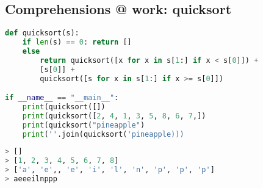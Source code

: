 \subsection{Comprehensions @ work: quicksort}
\begin{lstlisting}[language=Python]
def quicksort(s):
	if len(s) == 0: return []
	else
		return quicksort([x for x in s[1:] if x < s[0]]) + 
		[s[0]] + 
		quicksort([s for x in s[1:] if x >= s[0]])

if __name__ == "__main__":
	print(quicksort([])
	print(quicksort([2, 4, 1, 3, 5, 8, 6, 7,])
	print(quicksort("pineapple")
	print(''.join(quicksort('pineapple)))
\end{lstlisting}

\begin{lstlisting}[language=Python]
> []
> [1, 2, 3, 4, 5, 6, 7, 8]
> ['a', 'e',, 'e', 'i', 'l', 'n', 'p', 'p', 'p']
> aeeeilnppp
\end{lstlisting}



